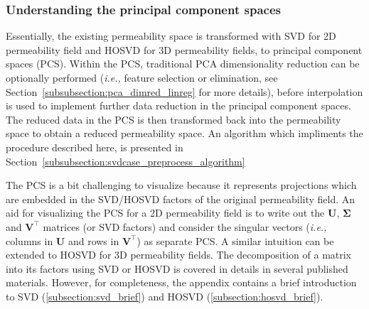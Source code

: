 \documentclass[preprint,12pt]{elsarticle}
\newcommand{\ie}{{\it i.e., }}
\begin{document}
\subsubsection{Understanding the principal component spaces}\label{subsubsection:visualization_pcspaces}
Essentially, the existing permeability space is transformed with SVD for 2D permeability field and HOSVD for 3D permeability fields, to principal component spaces (PCS). Within the PCS, traditional PCA dimensionality reduction can be optionally performed (\ie{feature selection or elimination}, see Section~\ref{subsubsection:pca_dimred_linreg} for more details), before interpolation is used to implement further data reduction in the principal component spaces. The reduced data in the PCS is then transformed back into the permeability space to obtain a reduced permeability space. An algorithm which impliments the procedure described here, is presented in Section~\ref{subsubsection:svdcase_preprocess_algorithm}

The PCS is a bit challenging to visualize because it represents projections which are embedded in the SVD/HOSVD factors of the original permeability field. An aid for visualizing the PCS for a 2D permeability field is to write out the $\mathbf{U}$, $\mathbf{\Sigma}$ and $\mathbf{V^{\intercal}}$ matrices (or SVD factors) and consider the singular vectors (\ie columns in $\mathbf{U}$ and rows in $\mathbf{V^{\intercal}}$) as separate PCS. A similar intuition can be extended to HOSVD for 3D permeability fields. The decomposition of a matrix into its factors using SVD  \cite{Cline_2007, Tharwat_2016} or HOSVD \cite{Kolda_2009, Lathauwer_2000} is covered in details in several published materials. However, for completeness, the appendix contains a brief introduction to SVD (\ref{subsection:svd_brief}) and HOSVD (\ref{subsection:hosvd_brief}).
\end{document}
